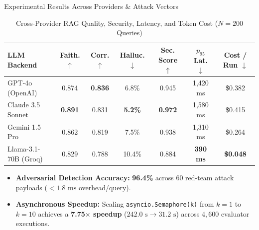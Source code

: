 \documentclass[aspectratio=169, 10pt]{beamer}
\begin{document}
\begin{frame}{Experimental Results Across Providers \& Attack Vectors}
    \begin{table}
        \centering
        \caption{Cross-Provider RAG Quality, Security, Latency, and Token Cost ($N=200$ Queries)}
        \footnotesize
        \begin{tabular}{l c c c c c c}
            \toprule
            \textbf{LLM Backend} & \textbf{Faith.} $\uparrow$ & \textbf{Corr.} $\uparrow$ & \textbf{Halluc.} $\downarrow$ & \textbf{Sec. Score} $\uparrow$ & \textbf{$p_{95}$ Lat.} $\downarrow$ & \textbf{Cost / Run} $\downarrow$ \\
            \midrule
            GPT-4o (OpenAI) & 0.874 & \textbf{0.836} & 6.8\% & 0.945 & 1,420 ms & \$0.382 \\
            Claude 3.5 Sonnet & \textbf{0.891} & 0.831 & \textbf{5.2\%} & \textbf{0.972} & 1,580 ms & \$0.415 \\
            Gemini 1.5 Pro & 0.862 & 0.819 & 7.5\% & 0.938 & 1,310 ms & \$0.264 \\
            Llama-3.1-70B (Groq) & 0.829 & 0.788 & 10.4\% & 0.884 & \textbf{390 ms} & \textbf{\$0.048} \\
            \bottomrule
        \end{tabular}
    \end{table}
    \vspace{0.1cm}
    \begin{itemize}
        \item \textbf{Adversarial Detection Accuracy:} \textbf{96.4\%} across 60 red-team attack payloads ($<1.8\text{ ms}$ overhead/query).
        \item \textbf{Asynchronous Speedup:} Scaling \texttt{asyncio.Semaphore(k)} from $k=1$ to $k=10$ achieves a \textbf{7.75$\times$ speedup} ($242.0\text{ s} \rightarrow 31.2\text{ s}$) across $4,600$ evaluator executions.
    \end{itemize}
\end{frame}
\end{document}
